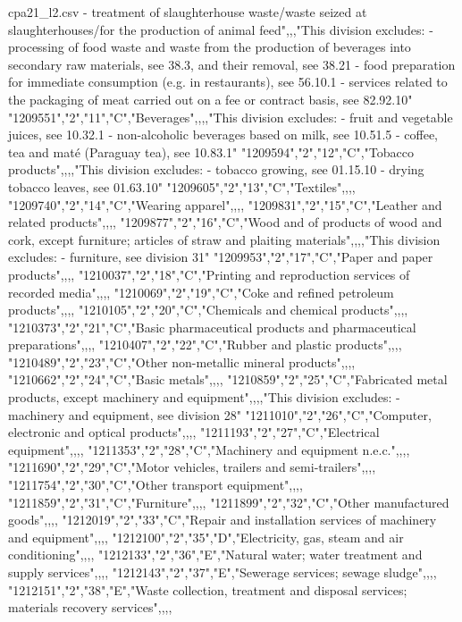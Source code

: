 \begin{filecontents*}{cpa21_l2.csv}
- treatment of slaughterhouse waste/waste seized at slaughterhouses/for the production of animal feed",,,"This division excludes:
- processing of food waste and waste from the production of beverages into secondary raw materials, see 38.3, and their removal, see 38.21
- food preparation for immediate consumption (e.g. in restaurants), see 56.10.1
- services related to the packaging of meat carried out on a fee or contract basis, see 82.92.10"
"1209551","2","11","C","Beverages",,,,"This division excludes:
- fruit and vegetable juices, see 10.32.1
- non-alcoholic beverages based on milk, see 10.51.5
- coffee, tea and maté (Paraguay tea), see 10.83.1"
"1209594","2","12","C","Tobacco products",,,,"This division excludes:
- tobacco growing, see 01.15.10
- drying tobacco leaves, see 01.63.10"
"1209605","2","13","C","Textiles",,,,
"1209740","2","14","C","Wearing apparel",,,,
"1209831","2","15","C","Leather and related products",,,,
"1209877","2","16","C","Wood and of products of wood and cork, except furniture; articles of straw and plaiting materials",,,,"This division excludes:
- furniture, see division 31"
"1209953","2","17","C","Paper and paper products",,,,
"1210037","2","18","C","Printing and reproduction services of recorded media",,,,
"1210069","2","19","C","Coke and refined petroleum products",,,,
"1210105","2","20","C","Chemicals and chemical products",,,,
"1210373","2","21","C","Basic pharmaceutical products and pharmaceutical preparations",,,,
"1210407","2","22","C","Rubber and plastic products",,,,
"1210489","2","23","C","Other non-metallic mineral products",,,,
"1210662","2","24","C","Basic metals",,,,
"1210859","2","25","C","Fabricated metal products, except machinery and equipment",,,,"This division excludes:
- machinery and equipment, see division 28"
"1211010","2","26","C","Computer, electronic and optical products",,,,
"1211193","2","27","C","Electrical equipment",,,,
"1211353","2","28","C","Machinery and equipment n.e.c.",,,,
"1211690","2","29","C","Motor vehicles, trailers and semi-trailers",,,,
"1211754","2","30","C","Other transport equipment",,,,
"1211859","2","31","C","Furniture",,,,
"1211899","2","32","C","Other manufactured goods",,,,
"1212019","2","33","C","Repair and installation services of machinery and equipment",,,,
"1212100","2","35","D","Electricity, gas, steam and air conditioning",,,,
"1212133","2","36","E","Natural water; water treatment and supply services",,,,
"1212143","2","37","E","Sewerage services; sewage sludge",,,,
"1212151","2","38","E","Waste collection, treatment and disposal services; materials recovery services",,,,

\end{filecontents*}
